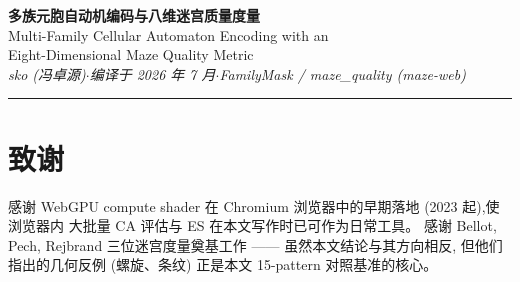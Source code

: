\documentclass[11pt,a4paper]{article}
\theoremstyle{plainstyle}
\begin{document}

\begin{center}
{\LARGE\bfseries\color{InkWarm} 多族元胞自动机编码与八维迷宫质量度量}\\[0.4em]
{\large\color{GrayMid} Multi-Family Cellular Automaton Encoding with an\\
Eight-Dimensional Maze Quality Metric}\\[0.7em]
{\small\itshape\color{GrayMid} sko (冯卓源)\quad$\cdot$\quad 编译于 2026 年 7 月\quad$\cdot$\quad FamilyMask / maze\_quality (maze-web)}
\end{center}

\vspace{0.4em}
\noindent\rule{\linewidth}{0.4pt}
\vspace{0.8em}



\tableofcontents
\vspace{0.4em}









\section*{致谢}
感谢 WebGPU compute shader 在 Chromium 浏览器中的早期落地 (2023 起),使浏览器内
大批量 CA 评估与 ES 在本文写作时已可作为日常工具。
感谢 Bellot, Pech, Rejbrand 三位迷宫度量奠基工作 —— 虽然本文结论与其方向相反,
但他们指出的几何反例 (螺旋、条纹) 正是本文 15-pattern 对照基准的核心。



\end{document}
